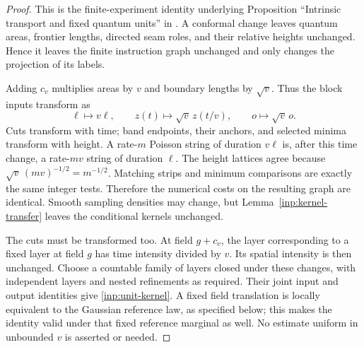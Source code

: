 \begin{proof}
This is the finite-experiment identity underlying Proposition ``Intrinsic
transport and fixed quantum units'' in \cite{MetricMaps}.
A conformal change leaves quantum areas, frontier lengths,
directed seam roles, and their relative heights unchanged.
Hence it leaves the finite instruction graph unchanged and
only changes the projection of its labels.

Adding $c_v$ multiplies areas by $v$ and boundary lengths by
$\sqrt v$.  Thus the block inputs transform as
\begin{equation}\label{inp:block-units}
 \ell\longmapsto v\ell,
 \qquad z(t)\longmapsto\sqrt v\,z(t/v),
 \qquad o\longmapsto\sqrt v\,o.
\end{equation}
Cuts transform with time; band endpoints, their anchors, and
selected minima transform with height.  A rate-$m$ Poisson
string of duration $v\ell$ is, after this time change, a
rate-$mv$ string of duration $\ell$.  The height lattices agree
because $\sqrt v\,(mv)^{-1/2}=m^{-1/2}$.  Matching strips and
minimum comparisons are exactly the same integer tests.
Therefore the numerical costs on the resulting graph are
identical.  Smooth sampling densities may change, but
Lemma~\ref{inp:kernel-transfer} leaves the conditional kernels
unchanged.

The cuts must be transformed too.  At field $g+c_v$, the layer
corresponding to a fixed layer at field $g$ has time intensity
divided by $v$.  Its spatial intensity is then unchanged.
Choose a countable family of layers closed under these changes,
with independent layers and nested refinements as required.
Their joint input and output identities give
\eqref{inp:unit-kernel}.  A fixed field translation is locally
equivalent to the Gaussian reference law, as specified below;
this makes the identity valid under that fixed reference
marginal as well.  No estimate uniform in unbounded $v$ is
asserted or needed.
\end{proof}

